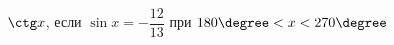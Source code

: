 \begin{ex}[type=calculate]
	\begin{condition}
		\( \ctg x \), \quad если \( \sin x=-\dfrac{12}{13} \) при \( 180\degree<x<270\degree \)
	\end{condition}
\end{ex}